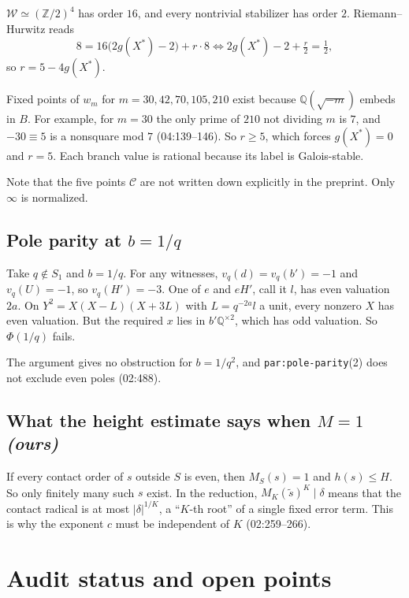 \documentclass[11pt]{article}
\theoremstyle{definition}
\newcommand{\Q}{\mathbb Q}
\newcommand{\Z}{\mathbb Z}
\newcommand{\Cpts}{\mathcal C}
\newcommand{\lbl}[1]{\texttt{#1}}
\newcommand{\src}[1]{\textsf{#1}}
\begin{document}
$\mathcal W\simeq(\Z/2)^4$ has order $16$, and every nontrivial stabilizer
has order $2$.  Riemann--Hurwitz reads
\[
 8=16\bigl(2g(X^*)-2\bigr)+r\cdot8
 \iff 2g(X^*)-2+\tfrac r2=\tfrac12,
\]
so $r=5-4g(X^*)$.

Fixed points of $w_m$ for $m=30,42,70,105,210$ exist because
$\Q(\sqrt{-m})$ embeds in $B$.  For example, for $m=30$ the only prime of
$210$ not dividing $m$ is $7$, and $-30\equiv5$ is a nonsquare mod $7$
(\src{04:139--146}).  So $r\ge5$, which forces $g(X^*)=0$ and $r=5$.  Each
branch value is rational because its label is Galois-stable.

Note that the five points $\Cpts$ are not written down explicitly in the
preprint.  Only $\infty$ is normalized.

\subsection{Pole parity at $b=1/q$}
Take $q\notin S_1$ and $b=1/q$.  For any witnesses, $v_q(d)=v_q(b')=-1$
and $v_q(U)=-1$, so $v_q(H')=-3$.  One of $e$ and $eH'$, call it $l$, has
even valuation $2a$.  On $Y^2=X(X-L)(X+3L)$ with $L=q^{-2a}l$ a unit, every
nonzero $X$ has even valuation.  But the required $x$ lies in
$b'\Q^{\times2}$, which has odd valuation.  So $\Phi(1/q)$ fails.

The argument gives no obstruction for $b=1/q^2$, and
\lbl{par:pole-parity}(2) does not exclude even poles (\src{02:488}).

\subsection{What the height estimate says when $M=1$ \emph{(ours)}}
If every contact order of $s$ outside $S$ is even, then $M_S(s)=1$ and
$h(s)\le H$.  So only finitely many such $s$ exist.  In the reduction,
$M_K(\widetilde s)^K\mid\delta$ means that the contact radical is at most
$|\delta|^{1/K}$, a ``$K$-th root'' of a single fixed error term.  This
is why the exponent $c$ must be independent of $K$ (\src{02:259--266}).

\section{Audit status and open points}\label{sec:audit}
\end{document}
